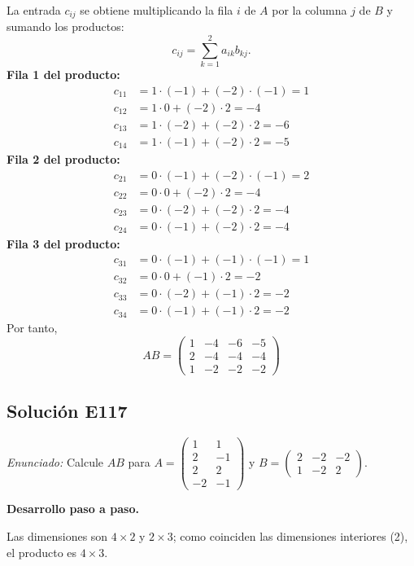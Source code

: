 \documentclass[12pt]{article}
\theoremstyle{remark}
\newcommand{\solucion}[2]{\Needspace{11\baselineskip}\subsection*{Solución E#1}\noindent\textit{Enunciado:} #2\par\medskip\noindent\textbf{Desarrollo paso a paso.}\par\medskip}
\begin{document}
La entrada $c_{ij}$ se obtiene multiplicando la fila $i$ de $A$ por la columna $j$ de $B$ y sumando los productos:
\[
c_{ij}=\sum_{k=1}^{2} a_{ik}b_{kj}.
\]
\textbf{Fila 1 del producto:}
\[
\begin{aligned}c_{11}&=1\cdot (-1)+(-2)\cdot (-1)=1\\c_{12}&=1\cdot 0+(-2)\cdot 2=-4\\c_{13}&=1\cdot (-2)+(-2)\cdot 2=-6\\c_{14}&=1\cdot (-1)+(-2)\cdot 2=-5\end{aligned}
\]
\textbf{Fila 2 del producto:}
\[
\begin{aligned}c_{21}&=0\cdot (-1)+(-2)\cdot (-1)=2\\c_{22}&=0\cdot 0+(-2)\cdot 2=-4\\c_{23}&=0\cdot (-2)+(-2)\cdot 2=-4\\c_{24}&=0\cdot (-1)+(-2)\cdot 2=-4\end{aligned}
\]
\textbf{Fila 3 del producto:}
\[
\begin{aligned}c_{31}&=0\cdot (-1)+(-1)\cdot (-1)=1\\c_{32}&=0\cdot 0+(-1)\cdot 2=-2\\c_{33}&=0\cdot (-2)+(-1)\cdot 2=-2\\c_{34}&=0\cdot (-1)+(-1)\cdot 2=-2\end{aligned}
\]
Por tanto,
\[
\boxed{AB=\begin{pmatrix}1&-4&-6&-5\\2&-4&-4&-4\\1&-2&-2&-2\end{pmatrix}}
\]

\medskip

\solucion{117}{Calcule $AB$ para $A=\begin{pmatrix}1&1\\2&-1\\2&2\\-2&-1\end{pmatrix}$ y $B=\begin{pmatrix}2&-2&-2\\1&-2&2\end{pmatrix}$.}
Las dimensiones son $4\times2$ y $2\times3$; como coinciden las dimensiones interiores (2), el producto es $4\times3$.
\end{document}
